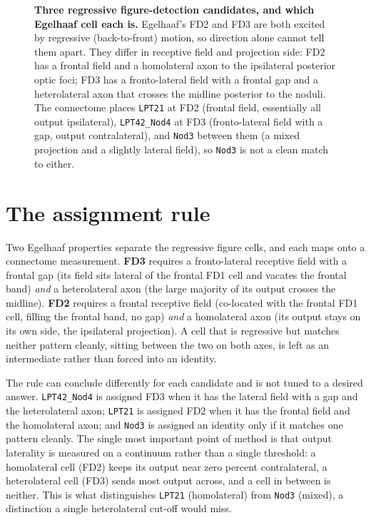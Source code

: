 \documentclass[11pt]{article}
\newcommand{\ttt}[1]{\texttt{#1}}
\begin{document}
\begin{figure}[H]
\caption{\textbf{Three regressive figure-detection candidates, and which Egelhaaf cell each is.}
Egelhaaf's FD2 and FD3 are both excited by regressive (back-to-front) motion, so direction alone
cannot tell them apart. They differ in receptive field and projection side: FD2 has a frontal field
and a homolateral axon to the ipsilateral posterior optic foci; FD3 has a fronto-lateral field with a
frontal gap and a heterolateral axon that crosses the midline posterior to the noduli. The connectome
places \ttt{LPT21} at FD2 (frontal field, essentially all output ipsilateral), \ttt{LPT42\_Nod4} at
FD3 (fronto-lateral field with a gap, output contralateral), and \ttt{Nod3} between them (a mixed
projection and a slightly lateral field), so \ttt{Nod3} is not a clean match to either.}%
\label{fig:concept}
\end{figure}


\section{The assignment rule}

Two Egelhaaf properties separate the regressive figure cells, and each maps onto a connectome
measurement. \textbf{FD3} requires a fronto-lateral receptive field with a frontal gap (its field sits
lateral of the frontal FD1 cell and vacates the frontal band) \emph{and} a heterolateral axon (the
large majority of its output crosses the midline). \textbf{FD2} requires a frontal receptive field
(co-located with the frontal FD1 cell, filling the frontal band, no gap) \emph{and} a homolateral axon
(its output stays on its own side, the ipsilateral projection). A cell that is regressive but matches
neither pattern cleanly, sitting between the two on both axes, is left as an intermediate rather than
forced into an identity.

The rule can conclude differently for each candidate and is not tuned to a desired answer. \ttt{LPT42\_Nod4}
is assigned FD3 when it has the lateral field with a gap and the heterolateral axon; \ttt{LPT21} is
assigned FD2 when it has the frontal field and the homolateral axon; and \ttt{Nod3} is assigned an
identity only if it matches one pattern cleanly. The single most important point of method is that
output laterality is measured on a continuum rather than a single threshold: a homolateral cell (FD2)
keeps its output near zero percent contralateral, a heterolateral cell (FD3) sends most output across,
and a cell in between is neither. This is what distinguishes \ttt{LPT21} (homolateral) from \ttt{Nod3}
(mixed), a distinction a single heterolateral cut-off would miss.
\end{document}
